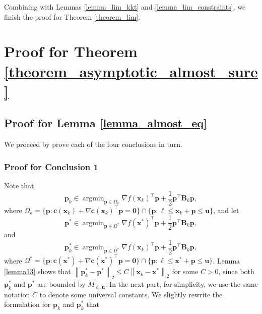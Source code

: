 \documentclass[aos]{imsart}
\numberwithin{equation}{section}
\theoremstyle{plain}
\begin{document}
\begin{appendix}
Combining with Lemmas \ref{lemma_lim_kkt} and \ref{lemma_lim_constraints}, we finish the proof for Theorem \ref{theorem_lim}.


\newpage
\section{Proof for Theorem \ref{theorem_asymptotic_almost_sure}}
\subsection{Proof for Lemma \ref{lemma_almost_eq}}
\label{sec:appendix3.1}
We proceed by prove each of the four conclusions in turn. 

\subsubsection{Proof for Conclusion 1} 
Note that 
    \begin{equation*}
            \bm{p}_{k} \in \mathop{\arg \min}_{\bm{p} \in \Omega_{k}} \nabla f(\bm{x}_{k})^{\top} \bm{p} + \frac{1}{2} \bm{p}^{\top} \bm{B}_{k} \bm{p},
    \end{equation*}
    where $\Omega_k = \{\bm{p}: \bm{c}(\bm{x}_k)+\nabla \bm{c}(\bm{x}_k)^{\top}\bm{p} = \bm{0}\} \cap \{\bm{p}: \bm{\ell} \leq \bm{x}_k + \bm{p} \leq \bm{u}\} $, and let
    \begin{equation*}
        \bm{p}^{*} \in \mathop{\arg \min}_{\bm{p} \in \Omega^{*}} \nabla f(\bm{x}^{*})^{\top} \bm{p} + \frac{1}{2} \bm{p}^{\top} \bm{B}_{k} \bm{p},
    \end{equation*}
    and
    \begin{equation*}
        \bm{p}_{k}^{*} \in \mathop{\arg \min}_{\bm{p} \in \Omega^{*}} \nabla f(\bm{x}_{k})^{\top} \bm{p} + \frac{1}{2} \bm{p}^{\top} \bm{B}_{k} \bm{p},
    \end{equation*}
    where $\Omega^{*} = \{\bm{p}: \bm{c}(\bm{x}^{*})+\nabla \bm{c}(\bm{x}^{*})^{\top}\bm{p} = \bm{0}\} \cap \{\bm{p}: \bm{\ell} \leq \bm{x}^{*} + \bm{p} \leq \bm{u}\} $. Lemma \ref{lemma13} shows that $\left\| \bm{p}_{k}^{*} - \bm{p}^{*} \right\|_2 \leq C \left\| \bm{x}_{k} - \bm{x}^{*} \right\|_2$ for some $C > 0$, since both $\bm{p}_{k}^{*} $ and $\bm{p}^{*}$ are bounded by $M_{\bm{\ell}, \bm{u}}$. In the next part, for simplicity, we use the same notation $C$ to denote some universal constants. We slightly rewrite the formulation for $\bm{p}_{k}$ and $\bm{p}_{k}^{*} $ that

\end{appendix}
\end{document}
